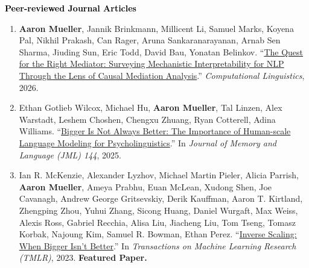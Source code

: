 \documentclass[10pt]{article}
\renewcommand{\subsection}[1]{\textcolor{black}{#1}}
\newcommand{\halfblankline}{\quad\vspace{-0.5\baselineskip}\pagebreak[3]}
\providecommand*\titlelink[2]{\href{#1}{\textcolor{accent}{#2}}}
\begin{document}
	\halfblankline

	\subsection{\textbf{Peer-reviewed Journal Articles}}
	\begin{enumerate}[leftmargin=*, topsep=0pt, itemsep=0.25ex, partopsep=0ex, parsep=1ex, label=J\arabic*., ref=J\arabic*]

	\item \textbf{Aaron Mueller}, Jannik Brinkmann, Millicent Li, Samuel Marks, Koyena Pal, Nikhil Prakash, Can Rager, Aruna Sankaranarayanan, Arnab Sen Sharma, Jiuding Sun, Eric Todd, David Bau, Yonatan Belinkov. ``\titlelink{https://direct.mit.edu/coli/article/doi/10.1162/COLI.a.572/133277/The-Quest-for-the-Right-Mediator-Surveying}{The Quest for the Right Mediator:  Surveying Mechanistic Interpretability for NLP Through the Lens of Causal Mediation Analysis}.'' \emph{Computational Linguistics}, 2026.
	
	\item Ethan Gotlieb Wilcox, Michael Hu, \textbf{Aaron Mueller}, Tal Linzen, Alex Warstadt, Leshem Choshen, Chengxu Zhuang, Ryan Cotterell, Adina Williams. ``\titlelink{https://osf.io/preprints/psyarxiv/rfwgd}{Bigger Is Not Always Better: The Importance of Human-scale Language Modeling for Psycholinguistics}.'' In \emph{Journal of Memory and Language (JML) 144}, 2025.

	\item Ian R. McKenzie, Alexander Lyzhov, Michael Martin Pieler, Alicia Parrish, \textbf{Aaron Mueller}, Ameya Prabhu, Euan McLean, Xudong Shen, Joe Cavanagh, Andrew George Gritsevskiy, Derik Kauffman, Aaron T. Kirtland, Zhengping Zhou, Yuhui Zhang, Sicong Huang, Daniel Wurgaft, Max Weiss, Alexis Ross, Gabriel Recchia, Alisa Liu, Jiacheng Liu, Tom Tseng, Tomasz Korbak, Najoung Kim, Samuel R. Bowman, Ethan Perez. ``\titlelink{https://arxiv.org/abs/2306.09479}{Inverse Scaling: When Bigger Isn't Better}.'' In \emph{Transactions on Machine Learning Research (TMLR)}, 2023. \textbf{\textcolor{accent}{Featured Paper.}}

	\end{enumerate}

	\halfblankline
\end{document}

